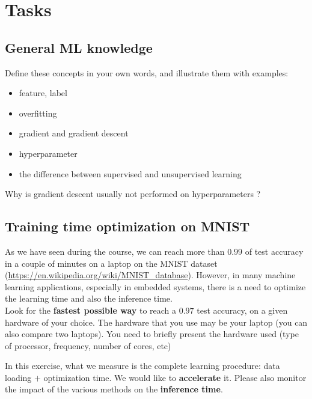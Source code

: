 \documentclass[
10pt, %
a4paper, %
oneside, %
headinclude,footinclude, %
BCOR5mm, %
]{scrartcl}
\begin{document}
\section{Tasks}%
\label{sub:tasks}

\subsection{General ML knowledge}%
\label{sub:ml}

Define these concepts in your own words, and illustrate them with examples:

\begin{itemize}
    \item feature, label
    \item overfitting
    \item gradient and gradient descent
    \item hyperparameter
    \item the difference between supervised and unsupervised learning
\end{itemize}

Why is gradient descent usually not performed on hyperparameters ?

\subsection{Training time optimization on MNIST}%
\label{sub:mnist}

As we have seen during the course, we can reach more than $0.99$ of test accuracy in a couple of minutes on a laptop on the MNIST dataset (\url{https://en.wikipedia.org/wiki/MNIST_database}). However, in many machine learning applications, especially in embedded systems, there is a need to optimize the learning time and also the inference time.
\\

Look for the \textbf{fastest possible way} to reach a $0.97$ test accuracy, on a given hardware of your choice. The hardware that you use may be your laptop 
(you can also compare two laptops). You need to briefly present the hardware used (type of processor, frequency, number of cores, etc)

In this exercise, what we measure is the complete learning procedure: data loading $+$ optimization time. We would like to \textbf{accelerate} it. Please also monitor the impact of the various methods on the \textbf{inference time}.
\end{document}
